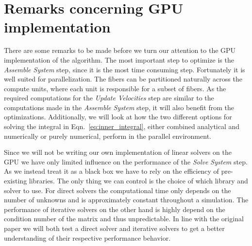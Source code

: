 \section{Remarks concerning GPU implementation}

There are some remarks to be made before we turn our attention to the GPU implementation of the algorithm. The most important step to optimize is the \emph{Assemble System} step, since it is the most time consuming step. Fortunately it is well suited for parallelization. The fibers can be partitioned naturally across the compute units, where each unit is responsible for a subset of fibers. As the required computations for the \emph{Update Velocities} step are similar to the computations made in the \emph{Assemble System} step, it will also benefit from the optimizations. Additionally, we will look at how the two different options for solving the integral in Eqn.~\eqref{eq:inner_integral}, either combined analytical and numerically or purely numerical, perform in the parallel environment.

Since we will not be writing our own implementation of linear solvers on the GPU we have only limited influence on the performance of the \emph{Solve System} step. As we instead treat it as a black box we have to rely on the efficiency of pre-existing libraries. The only thing we can control is the choice of which library and solver to use. For direct solvers the computational time only depends on the number of unknowns and is approximately constant throughout a simulation. The performance of iterative solvers on the other hand is highly depend on the condition number of the matrix and thus unpredictable. In line with the original paper we will both test a direct solver and iterative solvers to get a better understanding of their respective performance behavior.

